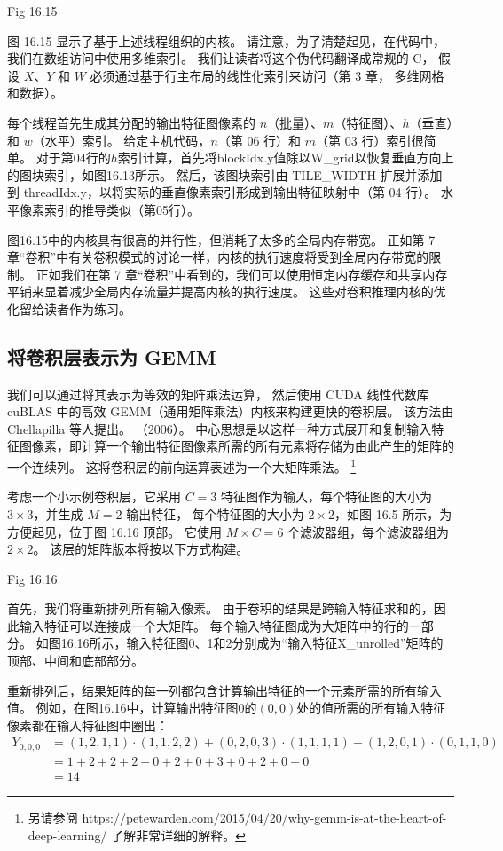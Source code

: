 {\color{red} Fig 16.15}

图 16.15 显示了基于上述线程组织的内核。 请注意，为了清楚起见，在代码中，我们在数组访问中使用多维索引。 
我们让读者将这个伪代码翻译成常规的 $\mathrm{C}$，
假设 $X、Y$ 和 $W$ 必须通过基于行主布局的线性化索引来访问（第 3 章， 多维网格和数据）。

每个线程首先生成其分配的输出特征图像素的 $n$（批量）、$m$（特征图）、$h$（垂直）和 $w$（水平）索引。 
给定主机代码，$n$（第 06 行）和 $m$（第 03 行）索引很简单。 
对于第04行的$h$索引计算，首先将blockIdx.y值除以W\_grid以恢复垂直方向上的图块索引，如图16.13所示。 
然后，该图块索引由 TILE\_WIDTH 扩展并添加到 threadIdx.y，以将实际的垂直像素索引形成到输出特征映射中（第 04 行）。 
水平像素索引的推导类似（第05行）。

图16.15中的内核具有很高的并行性，但消耗了太多的全局内存带宽。 
正如第 7 章“卷积”中有关卷积模式的讨论一样，内核的执行速度将受到全局内存带宽的限制。 
正如我们在第 7 章“卷积”中看到的，我们可以使用恒定内存缓存和共享内存平铺来显着减少全局内存流量并提高内核的执行速度。 
这些对卷积推理内核的优化留给读者作为练习。

\subsection{将卷积层表示为 GEMM}
我们可以通过将其表示为等效的矩阵乘法运算，
然后使用 CUDA 线性代数库 cuBLAS 中的高效 GEMM（通用矩阵乘法）内核来构建更快的卷积层。 
该方法由 Chellapilla 等人提出。 （2006）。 
中心思想是以这样一种方式展开和复制输入特征图像素，即计算一个输出特征图像素所需的所有元素将存储为由此产生的矩阵的一个连续列。 
这将卷积层的前向运算表述为一个大矩阵乘法。
\footnote{另请参阅 https://petewarden.com/2015/04/20/why-gemm-is-at-the-heart-of-deep-learning/ 了解非常详细的解释。}

考虑一个小示例卷积层，它采用 $C=3$ 特征图作为输入，每个特征图的大小为 $3 \times 3$，并生成 $M=2$ 输出特征，
每个特征图的大小为 $2 \times 2 $，如图 16.5 所示，为方便起见，位于图 16.16 顶部。 
它使用 $M \times C=6$ 个滤波器组，每个滤波器组为 $2 \times 2$。 该层的矩阵版本将按以下方式构建。

{\color{red} Fig 16.16}

首先，我们将重新排列所有输入像素。 由于卷积的结果是跨输入特征求和的，因此输入特征可以连接成一个大矩阵。 
每个输入特征图成为大矩阵中的行的一部分。 
如图16.16所示，输入特征图0、1和2分别成为“输入特征X\_unrolled”矩阵的顶部、中间和底部部分。

重新排列后，结果矩阵的每一列都包含计算输出特征的一个元素所需的所有输入值。 
例如，在图16.16中，计算输出特征图0的$(0,0)$处的值所需的所有输入特征像素都在输入特征图中圈出：
$$
\begin{aligned}
Y_{0,0,0} & =(1,2,1,1) \cdot(1,1,2,2)+(0,2,0,3) \cdot(1,1,1,1 )+(1,2,0,1) \cdot(0,1,1,0) \\
& =1+2+2+2+0+2+0+3+0+2+0+0 \\
&=14
\end{aligned}
$$

